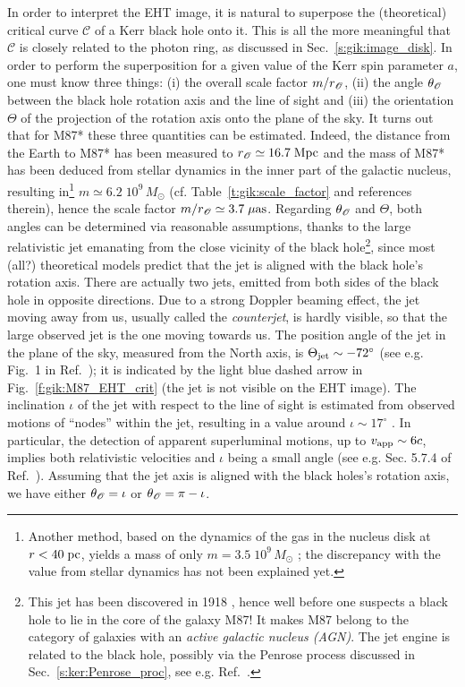 In order to interpret the EHT image, it is natural to superpose the (theoretical)
critical curve $\mathscr{C}$ of a Kerr black hole
onto it. This is all the more meaningful that $\mathscr{C}$ is closely related to
the photon ring, as discussed in Sec.~\ref{s:gik:image_disk}. In order to perform the
superposition for a given value of the Kerr spin parameter $a$, one must
know three things: (i) the overall scale factor $m/r_{\mathscr{O}}$, (ii) the angle $\theta_{\mathscr{O}}$ between the black hole rotation axis and the line of
sight and (iii) the orientation $\Theta$ of the projection of the rotation axis
onto the plane of the sky. It turns out that for M87* these three quantities can be estimated. Indeed, the distance from the Earth to M87* has been measured to
$r_{\mathscr{O}} \simeq 16.7 \; {\rm Mpc}$ and the mass of M87* has been deduced from stellar
dynamics in the inner part of the galactic nucleus, resulting in\footnote{Another method,
based on the dynamics of the gas in the nucleus disk at $r < 40 \; {\rm pc}$, yields
a mass of only $m = 3.5\; 10^9 \, M_\odot$ \cite{WalshBHS13}; the discrepancy
with the value from stellar dynamics has not been explained yet.}
$m\simeq 6.2\; 10^9 \, M_\odot$ (cf. Table~\ref{t:gik:scale_factor} and references therein), hence the scale factor $m/r_{\mathscr{O}} \simeq 3.7 \; \mu{\rm as}$. Regarding
$\theta_{\mathscr{O}}$ and $\Theta$, both angles can be determined via reasonable assumptions, thanks
to the large relativistic jet emanating from the close vicinity of the black hole\footnote{This jet has been discovered in 1918 \cite{Curtis1918}, hence
well before one suspects a black hole to lie
in the core of the galaxy M87! It makes M87 belong to the category of galaxies
with an \emph{active galactic nucleus (AGN)}. The jet engine
is related to the black hole, possibly via the Penrose process discussed in Sec.~\ref{s:ker:Penrose_proc}, see e.g. Ref.~\cite{AbramF13}.},
since most (all?) theoretical models predict that the jet is aligned with
the black hole's rotation axis. There are actually two jets, emitted from both
sides of the black hole in opposite directions. Due to a strong Doppler beaming effect,
the jet moving away from us, usually called the \emph{counterjet},
is hardly visible, so that the large observed jet is the one moving towards us.
The position angle of the jet in the plane of the sky, measured from the North axis,
is $\Theta_{\rm jet} \sim - 72^\circ$
(see e.g. Fig.~1 in Ref.~\cite{WalkeHDLJ18}); it is indicated by the light blue dashed
arrow in Fig.~\ref{f:gik:M87_EHT_crit} (the jet is not visible on the EHT image).
The inclination  $\iota$ of the jet with respect to the
line of sight is estimated from observed motions of ``nodes'' within the jet,
resulting in a value around $\iota \sim 17^\circ$
\cite{MerteLWH16,WalkeHDLJ18}. In particular, the detection of
apparent superluminal motions, up to $v_{\rm app} \sim 6 c$, implies
both relativistic velocities and $\iota$ being a small angle (see e.g. Sec. 5.7.4 of Ref.~\cite{Gourg13}).
Assuming that the jet axis is aligned with the black holes's rotation axis, we have either
$\theta_{\mathscr{O}} = \iota$ or $\theta_{\mathscr{O}} = \pi - \iota$.

